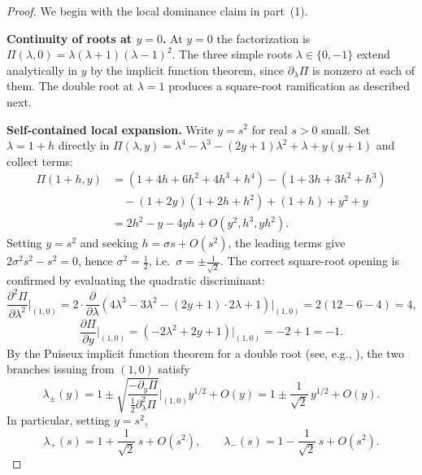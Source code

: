 \begin{proof}
We begin with the local dominance claim in part~(1).

\medskip
\noindent\textbf{Continuity of roots at $y=0$.}
At $y=0$ the factorization is $\Pi(\lambda,0)=\lambda(\lambda+1)(\lambda-1)^2$.
The three simple roots $\lambda\in\{0,-1\}$ extend analytically in $y$ by the implicit function theorem, since $\partial_\lambda\Pi$ is nonzero at each of them.
The double root at $\lambda=1$ produces a square-root ramification as described next.

\medskip
\noindent\textbf{Self-contained local expansion.}
Write $y=s^2$ for real $s>0$ small.
Set $\lambda=1+h$ directly in $\Pi(\lambda,y)=\lambda^4-\lambda^3-(2y+1)\lambda^2+\lambda+y(y+1)$ and collect terms:
\begin{align*}
\Pi(1+h,y)
&= (1+4h+6h^2+4h^3+h^4) - (1+3h+3h^2+h^3)\\
&\quad - (1+2y)(1+2h+h^2) + (1+h) + y^2+y\\
&= 2h^2 - y - 4yh + O(y^2, h^3, yh^2).
\end{align*}
Setting $y=s^2$ and seeking $h=\sigma s+O(s^2)$, the leading terms give $2\sigma^2 s^2 - s^2 = 0$, hence $\sigma^2=\tfrac12$, i.e.\ $\sigma=\pm\tfrac{1}{\sqrt{2}}$.
The correct square-root opening is confirmed by evaluating the quadratic discriminant:
\[
\frac{\partial^2\Pi}{\partial\lambda^2}\bigg|_{(1,0)} = 2\cdot\frac{\partial}{\partial\lambda}(4\lambda^3-3\lambda^2-(2y+1)\cdot 2\lambda+1)\bigg|_{(1,0)}=2(12-6-4)=4,
\]
\[
\frac{\partial\Pi}{\partial y}\bigg|_{(1,0)} = (-2\lambda^2+2y+1)\bigg|_{(1,0)}=-2+1=-1.
\]
By the Puiseux implicit function theorem for a double root (see, e.g., \cite{BrieskornKnorrer1986}), the two branches issuing from $(1,0)$ satisfy
\begin{equation}\label{eq:local-bifurc}
\lambda_\pm(y)
= 1 \pm \sqrt{\frac{-\partial_y\Pi}{\tfrac12\partial_\lambda^2\Pi}}\bigg|_{(1,0)} y^{1/2} + O(y)
= 1 \pm \frac{1}{\sqrt{2}}\,y^{1/2} + O(y).
\end{equation}
In particular, setting $y=s^2$,
\begin{equation}\label{eq:lambda-pm-local}
\lambda_+(s) = 1 + \frac{1}{\sqrt{2}}\,s + O(s^2),
\qquad
\lambda_-(s) = 1 - \frac{1}{\sqrt{2}}\,s + O(s^2).
\end{equation}


\end{proof}
